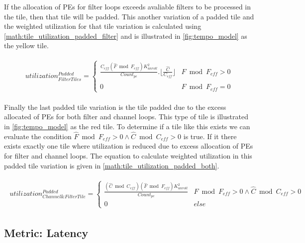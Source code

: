 If the allocation of PEs for filter loops exceeds avaliable filters to be
processed in the tile, then that tile will be padded. This another variation of
a padded tile and the weighted utilization for that tile variation is calculated
using \autoref{math:tile_utilization_padded_filter} and is illustrated in
\autoref{fig:tempo_model} as the yellow tile.

\begin{align}
    \begin{gathered}
        utilization^{Padded}_{FilterTiles} = \begin{cases} \frac{ C_{eff} (\hat{F} \bmod F_{eff}) K_{unroll}^2}{Count_{pe}}.\lfloor \frac{\hat{C}}{C_{eff}} \rfloor
            & \hat{F} \bmod F_{eff} > 0 \\ 0
            & \hat{F} \bmod F_{eff} = 0 \end{cases}
            \end{gathered}
    \label{math:tile_utilization_padded_filter}
\end{align}

Finally the last padded tile variation is the tile padded due to the excess
allocated of PEs for both filter and channel loops. This type of tile is
illustrated in \autoref{fig:tempo_model} as the red tile.  To determine if a tile like this
exists we can evaluate the condition $\hat{F} \bmod F_{eff} > 0 \land \hat{C}
\bmod C_{eff} > 0$ is true. If it there exists exactly one tile where
utilization is reduced due to excess allocation of PEs for filter and channel
loops. The equation to calculate weighted utilization in this padded tile
variation is given in \autoref{math:tile_utilization_padded_both}.

\begin{align}
    \begin{gathered}
         utilization^{Padded}_{Channel\&FilterTile} = \begin{cases} \frac{(\hat{C} \bmod C_{eff}) (\hat{F} \bmod F_{eff}) K_{unroll}^2}{Count_{pe}} & \hat{F} \bmod F_{eff} > 0 \land \hat{C} \bmod C_{eff} > 0 \\0  & else\end{cases}
            \end{gathered}
    \label{math:tile_utilization_padded_both}
\end{align}

\subsection{Metric: Latency}
\label{chap:dataflow_dse:exploring:tempo_model:latency}

